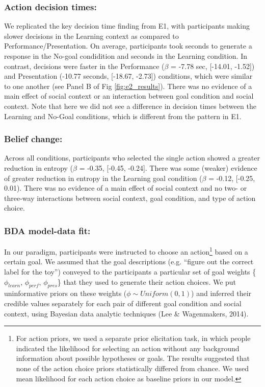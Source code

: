 \documentclass[10pt, letterpaper]{article}
\begin{document}
\subsubsection{Action decision times:}\label{action-decision-times-1}

We replicated the key decision time finding from E1, with participants
making slower decisions in the Learning context as compared to
Performance/Presentation. On average, participants took seconds to
generate a response in the No-goal condidition and seconds in the
Learning condition. In contrast, decisions were faster in the
Performance (\(\beta\) = -7.78 sec, {[}-14.01, -1.52{]}) and
Presentation (-10.77 seconds, {[}-18.67, -2.73{]}) conditions, which
were similar to one another (see Panel B of Fig \ref{fig:e2_results}).
There was no evidence of a main effect of social context or an
interaction between goal condition and social context. Note that here we
did not see a difference in decision times between the Learning and
No-Goal conditions, which is different from the pattern in E1.

\subsubsection{Belief change:}\label{belief-change-1}

Across all conditions, participants who selected the single action
showed a greater reduction in entropy (\(\beta\) = -0.35, {[}-0.45,
-0.24{]}. There was some (weaker) evidence of greater reduction in
entropy in the Learning goal condition (\(\beta\) = -0.12, {[}-0.25,
0.01). There was no evidence of a main effect of social context and no
two- or three-way interactions between social context, goal condition,
and type of action choice.

\subsubsection{BDA model-data fit:}\label{bda-model-data-fit}

In our paradigm, participants were instructed to choose an
action\footnote{For action priors, we used a separate prior elicitation task, in which people indicated the likelihood for selecting an action without any background information about possible hypotheses or goals. The results suggested that none of the action choice priors statistically differed from chance. We used mean likelihood for each action choice as baseline priors in our model.}
based on a certain goal. We assumed that the goal descriptions (e.g.
``figure out the correct label for the toy'') conveyed to the
participants a particular set of goal weights \{\(\phi_{learn}\),
\(\phi_{perf}\), \(\phi_{pres}\)\} that they used to generate their
action choices. We put uninformative priors on these weights
(\(\phi \sim Uniform(0,1)\)) and inferred their credible values
separately for each pair of different goal condition and social context,
using Bayesian data analytic techniques (Lee \& Wagenmakers, 2014).
\end{document}
